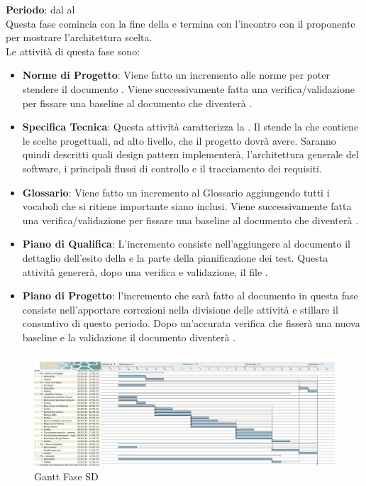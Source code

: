 	\textbf{Periodo}: dal  al  \\Questa fase comincia con la fine della  e termina con l'incontro con il proponente per mostrare l'architettura scelta.\\
	Le attività di questa fase sono:
	\begin{itemize}
		\item \textbf{Norme di Progetto}: Viene fatto un incremento alle norme per poter stendere il documento . Viene successivamente fatta una verifica/validazione per fissare una baseline al documento che diventerà .
		\item \textbf{Specifica Tecnica}: Questa attività caratterizza la . Il  stende la  che contiene le scelte progettuali, ad alto livello, che il progetto dovrà avere. Saranno quindi descritti quali design pattern \projectname{} implementerà, l'architettura generale del software, i principali flussi di controllo e il tracciamento dei requisiti.
		\item \textbf{Glossario}: Viene fatto un incremento al Glossario aggiungendo tutti i vocaboli che si ritiene importante siano inclusi. Viene successivamente fatta una verifica/validazione per fissare una baseline al documento che diventerà .
		\item \textbf{Piano di Qualifica}: L'incremento consiste nell'aggiungere al documento  il dettaglio dell'esito della  e la parte della pianificazione dei test. Questa attività genererà, dopo una verifica e validazione, il file .
		\item \textbf{Piano di Progetto}: l'incremento che sarà fatto al documento  in questa fase consiste nell'apportare correzioni nella divisione delle attività e stillare il consuntivo di questo periodo. Dopo un'accurata verifica che fisserà una nuova baseline e la validazione il documento diventerà .
	\end{itemize}
	\begin{figure}[H]\centering
		\includegraphics[width=\textwidth]{PianoDiProgetto/Pics/FaseSD.png}
	\caption{Gantt Fase SD}
\end{figure}
